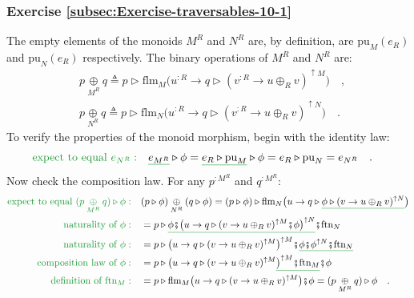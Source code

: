 \subsubsection*{Exercise \ref{subsec:Exercise-traversables-10-1}}

The empty elements of the monoids $M^{R}$ and $N^{R}$ are, by definition,
are $\text{pu}_{M}(e_{R})$ and $\text{pu}_{N}(e_{R})$ respectively.
The binary operations of $M^{R}$ and $N^{R}$ are:
\begin{align*}
 & p\underset{M^{R}}{\oplus}q\triangleq p\triangleright\text{flm}_{M}\big(u^{:R}\rightarrow q\triangleright(v^{:R}\rightarrow u\oplus_{R}v)^{\uparrow M}\big)\quad,\\
 & p\underset{N^{R}}{\oplus}q\triangleq p\triangleright\text{flm}_{N}\big(u^{:R}\rightarrow q\triangleright(v^{:R}\rightarrow u\oplus_{R}v)^{\uparrow N}\big)\quad.
\end{align*}
To verify the properties of the monoid morphism, begin with the identity
law:
\begin{align*}
{\color{greenunder}\text{expect to equal }e_{N^{R}}:}\quad & \gunderline{e_{M^{R}}}\triangleright\phi=\gunderline{e_{R}\triangleright\text{pu}_{M}}\triangleright\phi=e_{R}\triangleright\text{pu}_{N}=e_{N^{R}}\quad.
\end{align*}
Now check the composition law. For any $p^{:M^{R}}$ and $q^{:M^{R}}$:
\begin{align*}
{\color{greenunder}\text{expect to equal }(p\underset{M^{R}}{\oplus}q)\triangleright\phi:}\quad & (p\triangleright\phi)\underset{N^{R}}{\oplus}(q\triangleright\phi)=(p\triangleright\phi)\triangleright\text{flm}_{N}\big(u\rightarrow q\triangleright\gunderline{\phi\triangleright(v\rightarrow u\oplus_{R}v)^{\uparrow N}}\big)\\
{\color{greenunder}\text{naturality of }\phi:}\quad & =p\triangleright\gunderline{\phi\bef\big(u\rightarrow q\triangleright(v\rightarrow u\oplus_{R}v)^{\uparrow M}\bef\phi\big)^{\uparrow N}}\bef\text{ftn}_{N}\\
{\color{greenunder}\text{naturality of }\phi:}\quad & =p\triangleright\big(u\rightarrow q\triangleright(v\rightarrow u\oplus_{R}v)^{\uparrow M}\big)^{\uparrow M}\bef\gunderline{\phi\bef\phi^{\uparrow N}\bef\text{ftn}_{N}}\\
{\color{greenunder}\text{composition law of }\phi:}\quad & =p\triangleright\big(u\rightarrow q\triangleright(v\rightarrow u\oplus_{R}v)^{\uparrow M}\gunderline{\big)^{\uparrow M}\bef\text{ftn}_{M}}\bef\phi\\
{\color{greenunder}\text{definition of }\text{ftn}_{M}:}\quad & =p\triangleright\text{flm}_{M}\big(u\rightarrow q\triangleright(v\rightarrow u\oplus_{R}v)^{\uparrow M}\big)\bef\phi=(p\underset{M^{R}}{\oplus}q)\triangleright\phi\quad.
\end{align*}


